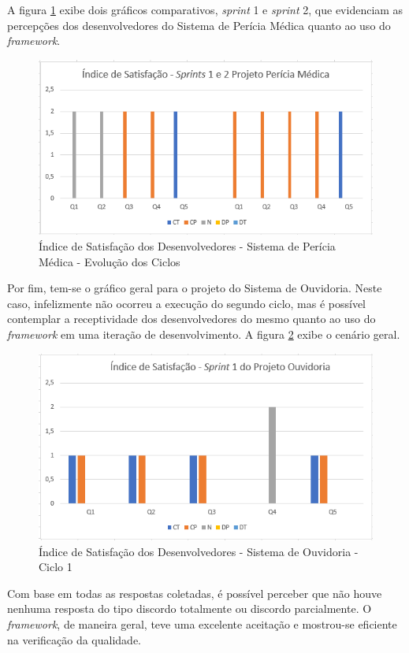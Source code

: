 A figura \ref{fig:evolucaoPericia} exibe dois gráficos comparativos, \textit{sprint} 1 e \textit{sprint} 2, que evidenciam as percepções dos desenvolvedores do Sistema de Perícia Médica quanto ao uso do \textit{framework}.

\begin{figure}[h]
\includegraphics[width=\textwidth]{figuras/isd_pericia_medica.png}
\caption{Índice de Satisfação dos Desenvolvedores - Sistema de Perícia Médica - Evolução dos Ciclos}
\label{fig:evolucaoPericia}
\end{figure}

\hfill \break

\hfill \break

\hfill \break

\hfill \break

\hfill \break

Por fim, tem-se o gráfico geral para o projeto do Sistema de Ouvidoria. Neste caso, infelizmente não ocorreu a execução do segundo ciclo, mas é possível contemplar a receptividade dos desenvolvedores do mesmo quanto ao uso do \textit{framework} em uma iteração de desenvolvimento. A figura \ref{fig:evolucaoOuvdf} exibe o cenário geral.

\begin{figure}[h]
\includegraphics[width=\textwidth]{figuras/isd_ouvdf.png}
\caption{Índice de Satisfação dos Desenvolvedores - Sistema de Ouvidoria - Ciclo 1}
\label{fig:evolucaoOuvdf}
\end{figure}

Com base em todas as respostas coletadas, é possível perceber que não houve nenhuma resposta do tipo discordo totalmente ou discordo parcialmente. O \textit{framework}, de maneira geral, teve uma excelente aceitação e mostrou-se eficiente na verificação da qualidade.

\clearpage